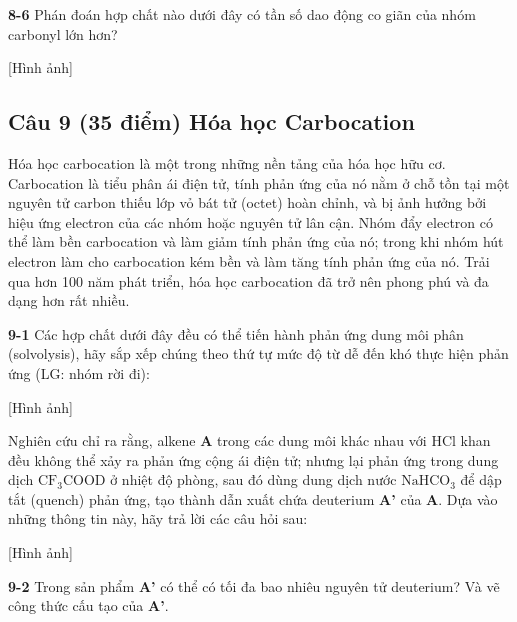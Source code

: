 \vspace{0.2cm}

\noindent
\textbf{8-6} Phán đoán hợp chất nào dưới đây có tần số dao động co giãn của nhóm carbonyl lớn hơn?
\begin{center}
    [Hình ảnh]
\end{center}

\vspace{0.5cm}

\subsection{Câu 9 (35 điểm) Hóa học Carbocation}

Hóa học carbocation là một trong những nền tảng của hóa học hữu cơ. Carbocation là tiểu phân ái điện tử, tính phản ứng của nó nằm ở chỗ tồn tại một nguyên tử carbon thiếu lớp vỏ bát tử (octet) hoàn chỉnh, và bị ảnh hưởng bởi hiệu ứng electron của các nhóm hoặc nguyên tử lân cận. Nhóm đẩy electron có thể làm bền carbocation và làm giảm tính phản ứng của nó; trong khi nhóm hút electron làm cho carbocation kém bền và làm tăng tính phản ứng của nó. Trải qua hơn 100 năm phát triển, hóa học carbocation đã trở nên phong phú và đa dạng hơn rất nhiều.

\vspace{0.2cm}

\noindent
\textbf{9-1} Các hợp chất dưới đây đều có thể tiến hành phản ứng dung môi phân (solvolysis), hãy sắp xếp chúng theo thứ tự mức độ từ dễ đến khó thực hiện phản ứng (LG: nhóm rời đi):
\begin{center}
    [Hình ảnh]
\end{center}

\vspace{0.2cm}

\noindent
Nghiên cứu chỉ ra rằng, alkene \textbf{A} trong các dung môi khác nhau với $\mathrm{HCl}$ khan đều không thể xảy ra phản ứng cộng ái điện tử; nhưng lại phản ứng trong dung dịch $\mathrm{CF_3COOD}$ ở nhiệt độ phòng, sau đó dùng dung dịch nước $\mathrm{NaHCO_3}$ để dập tắt (quench) phản ứng, tạo thành dẫn xuất chứa deuterium \textbf{A'} của \textbf{A}. Dựa vào những thông tin này, hãy trả lời các câu hỏi sau:
\begin{center}
    [Hình ảnh]
\end{center}

\noindent
\textbf{9-2} Trong sản phẩm \textbf{A'} có thể có tối đa bao nhiêu nguyên tử deuterium? Và vẽ công thức cấu tạo của \textbf{A'}.


